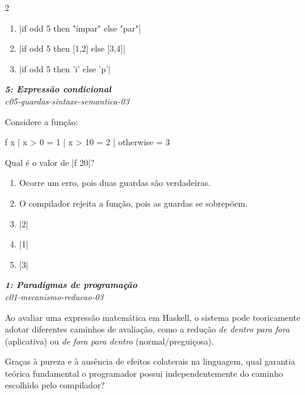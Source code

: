 \documentclass[a4paper,10pt,brazil]{article}
\begin{document}
\begin{multicols}{2}
\begin{enumerate}
  \item \haskellinline|if odd 5 then "ímpar" else "par"|

  \item \haskellinline|if odd 5 then [1,2] else [3,4]|

  \item \haskellinline|if odd 5 then 'i' else 'p'|


\end{enumerate}

\begin{flushright}
  \footnotesize
  \textit{\textbf{5: Expressão condicional}}\\
  \textit{c05-guardas-sintaxe-semantica-03}\\

\end{flushright}
Considere a função:
\begin{haskellcode}
f x
  | x > 0     = 1
  | x > 10    = 2
  | otherwise = 3
\end{haskellcode}
Qual é o valor de \haskellinline|f 20|?

\begin{enumerate}
  \item Ocorre um erro, pois duas guardas são verdadeiras.

  \item O compilador rejeita a função, pois as guardas se sobrepõem.

  \item \haskellinline|2|

  \item \haskellinline|1|

  \item \haskellinline|3|


\end{enumerate}

\begin{flushright}
  \footnotesize
  \textit{\textbf{1: Paradigmas de programação}}\\
  \textit{c01-mecanismo-reducao-03}\\

\end{flushright}
Ao avaliar uma expressão matemática em Haskell, o sistema pode teoricamente adotar diferentes caminhos de avaliação, como a redução \emph{de dentro para fora} (aplicativa) ou \emph{de fora para dentro} (normal/preguiçosa). 

Graças à pureza e à ausência de efeitos colaterais na linguagem, qual garantia teórica fundamental o programador possui independentemente do caminho escolhido pelo compilador?


\end{multicols}
\end{document}
